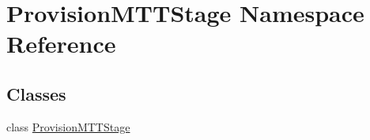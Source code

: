 \hypertarget{namespace_provision_m_t_t_stage}{\section{Provision\-M\-T\-T\-Stage Namespace Reference}
\label{namespace_provision_m_t_t_stage}
}
\subsection*{Classes}
\begin{DoxyCompactItemize}
\item 
class \hyperlink{class_provision_m_t_t_stage_1_1_provision_m_t_t_stage}{Provision\-M\-T\-T\-Stage}
\end{DoxyCompactItemize}
